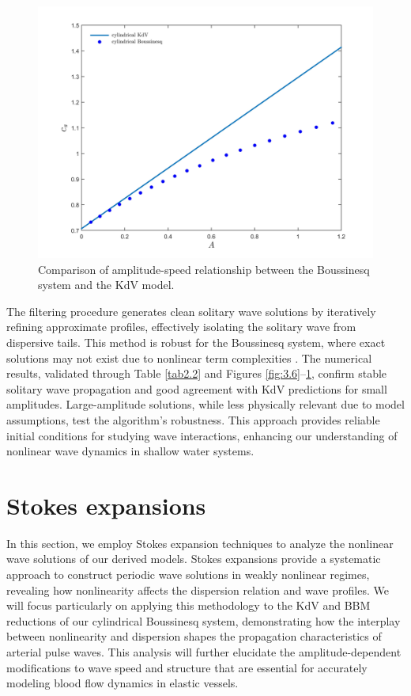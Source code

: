 \documentclass[alpha-refs, 12pt]{wiley-article}
\begin{document}
\begin{figure}[ht]
  \centering
  \includegraphics[width=0.65\linewidth]{figs/my_figure1.jpg}
  \caption{Comparison of amplitude-speed relationship between the Boussinesq system and the KdV model.}
  \label{fig:3.8}
\end{figure}

The filtering procedure generates clean solitary wave solutions by iteratively refining approximate profiles, effectively isolating the solitary wave from dispersive tails. This method is robust for the Boussinesq system, where exact solutions may not exist due to nonlinear term complexities \cite{BDM2}. The numerical results, validated through Table \ref{tab2.2} and Figures \ref{fig:3.6}--\ref{fig:3.8}, confirm stable solitary wave propagation and good agreement with KdV predictions for small amplitudes. Large-amplitude solutions, while less physically relevant due to model assumptions, test the algorithm's robustness. This approach provides reliable initial conditions for studying wave interactions, enhancing our understanding of nonlinear wave dynamics in shallow water systems.

\section{Stokes expansions}\label{sec:stokes}

In this section, we employ Stokes expansion techniques to analyze the nonlinear wave solutions of our derived models. Stokes expansions provide a systematic approach to construct periodic wave solutions in weakly nonlinear regimes, revealing how nonlinearity affects the dispersion relation and wave profiles. We will focus particularly on applying this methodology to the KdV and BBM reductions of our cylindrical Boussinesq system, demonstrating how the interplay between nonlinearity and dispersion shapes the propagation characteristics of arterial pulse waves. This analysis will further elucidate the amplitude-dependent modifications to wave speed and structure that are essential for accurately modeling blood flow dynamics in elastic vessels.
\end{document}
